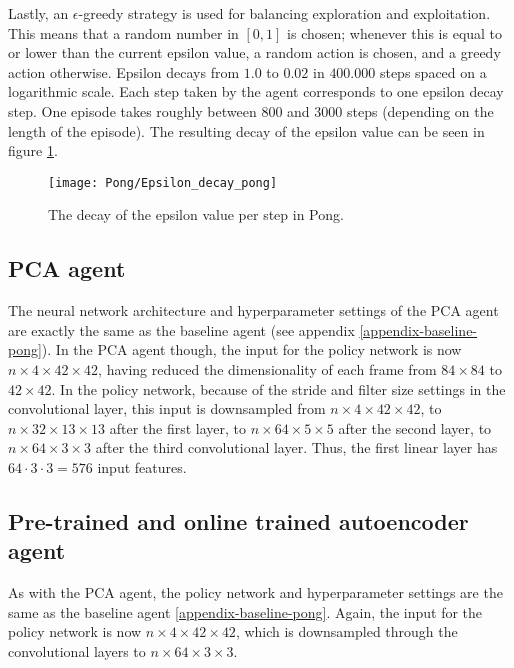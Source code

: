 Lastly, an $\epsilon$-greedy strategy is used for balancing exploration and exploitation. This means that a random number in $[0,1]$ is chosen; whenever this is equal to or lower than the current epsilon value, a random action is chosen, and a greedy action otherwise. Epsilon decays from $1.0$ to $0.02$ in $400.000$ steps spaced on a logarithmic scale. Each step taken by the agent corresponds to one epsilon decay step. One episode takes roughly between $800$ and $3000$ steps (depending on the length of the episode). The resulting decay of the epsilon value can be seen in figure \ref{fig:epsilon-pong}.

\begin{figure}[h]
    \centering
    \texttt{[image: Pong/Epsilon\_decay\_pong]}
    \caption{The decay of the epsilon value per step in Pong.}
    \label{fig:epsilon-pong}
\end{figure}

\subsection{PCA agent}
The neural network architecture and hyperparameter settings of the PCA agent are exactly the same as the baseline agent (see appendix \ref{appendix-baseline-pong}). In the PCA agent though, the input for the policy network is now $n \times 4 \times 42 \times 42$, having reduced the dimensionality of each frame from $84 \times 84$ to $42 \times 42$. In the policy network, because of the stride and filter size settings in the convolutional layer, this input is downsampled from $n \times 4 \times 42 \times 42$, to $n \times 32 \times 13 \times 13$ after the first layer, to $n \times 64 \times 5 \times 5$ after the second layer, to $n \times 64 \times 3 \times 3$ after the third convolutional layer. Thus, the first linear layer has $64 \cdot 3 \cdot 3 = 576$ input features.


\subsection{Pre-trained and online trained autoencoder agent} %
As with the PCA agent, the policy network and hyperparameter settings are the same as the baseline agent \ref{appendix-baseline-pong}. Again, the input for the policy network is now $n \times 4 \times 42 \times 42$, which is downsampled through the convolutional layers to $n \times 64 \times 3 \times 3$. \par

